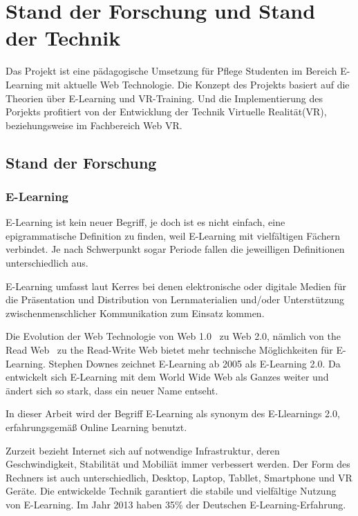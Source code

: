 \chapter{Stand der Forschung und Stand der Technik}

Das Projekt ist eine pädagogische Umsetzung für Pflege Studenten im Bereich E-Learning mit aktuelle Web Technologie. Die Konzept des Projekts basiert auf die Theorien über E-Learning und VR-Training. Und die Implementierung des Porjekts profitiert von der Entwicklung der Technik Virtuelle Realität(VR), beziehungsweise im Fachbereich Web VR.

\section{Stand der Forschung}
 \subsection{E-Learning}
 E-Learning ist kein neuer Begriff, je doch ist es nicht einfach, eine epigrammatische Definition zu finden, weil E-Learning mit vielfältigen Fächern verbindet. Je nach Schwerpunkt sogar Periode fallen die jeweilligen Definitionen unterschiedlich aus.

E-Learning umfasst laut Kerres \citep{1} \glqq bei denen elektronische oder digitale Medien für die Präsentation und Distribution von Lernmaterialien und/oder Unterstützung zwischenmenschlicher Kommunikation zum Einsatz kommen.\grqq

Die Evolution der Web Technologie von \glqq Web 1.0 \grqq\ zu \glqq Web 2.0\grqq \citep{3}, nämlich von \glqq the Read Web \grqq\ zu \glqq the Read-Write Web\grqq \citep{4} bietet mehr technische Möglichkeiten für E-Learning. Stephen Downes \citep{2} zeichnet E-Learning ab 2005 als E-Learning 2.0. Da \glqq entwickelt sich E-Learning mit dem World Wide Web als Ganzes weiter und ändert sich so stark, dass ein neuer Name entseht.\grqq

In dieser Arbeit wird der Begriff E-Learning als synonym des E-Llearnings 2.0, erfahrungsgemäß Online Learning benutzt.
 
Zurzeit bezieht Internet sich auf notwendige Infrastruktur, deren Geschwindigkeit, Stabilität und Mobiliät immer verbessert werden. Der Form des Rechners ist auch unterschiedlich, Desktop, Laptop, Tabllet, Smartphone und VR Geräte. Die entwickelde Technik garantiert die stabile und vielfältige Nutzung von E-Learning. Im Jahr 2013 haben 35\% der Deutschen E-Learning-Erfahrung.

